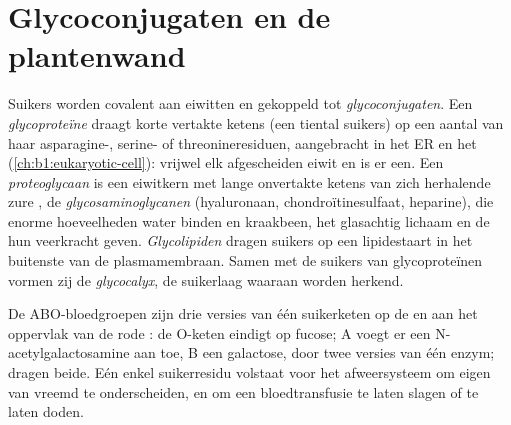 \section{Glycoconjugaten en de plantenwand}

\begin{definition}\label{def:b1:carbohydrates:glycoconjugate}
Suikers worden covalent aan eiwitten en  gekoppeld tot
\emph{glycoconjugaten}. Een
\emph{glycoproteïne} draagt korte vertakte ketens (een
tiental suikers) op een aantal van haar asparagine-, serine- of
threonineresiduen, aangebracht in het ER en het 
(\cref{ch:b1:eukaryotic-cell}): vrijwel elk afgescheiden eiwit en  is
er een. Een \emph{proteoglycaan} is een eiwitkern met lange
onvertakte ketens van zich herhalende zure , de
\emph{glycosaminoglycanen} (hyaluronaan,
chondroïtinesulfaat, heparine), die enorme hoeveelheden water binden en kraakbeen,
het glasachtig lichaam en de  hun veerkracht geven.
\emph{Glycolipiden} dragen suikers op een lipidestaart in het
buitenste  van de plasmamembraan. Samen met de suikers van glycoproteïnen
vormen zij de \emph{glycocalyx}, de suikerlaag waaraan 
worden herkend.
\end{definition}

\begin{example}[Bloedgroepen]\label{ex:b1:carbohydrates:abo}
De ABO-bloedgroepen zijn drie versies van één suikerketen op de  en
 aan het oppervlak van de rode : de O-keten eindigt op fucose; A
voegt er een N-acetylgalactosamine aan toe, B een galactose, door twee versies van
één enzym;  dragen beide. Eén enkel suikerresidu volstaat voor het
afweersysteem om eigen van vreemd te onderscheiden, en om een bloedtransfusie te
laten slagen of te laten doden.
\end{example}

